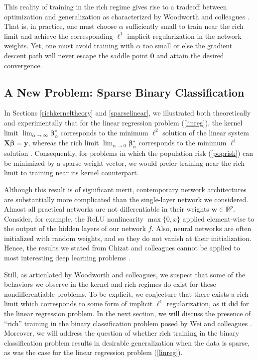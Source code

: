 \documentclass{article}
\begin{document}
This reality of training in the rich regime gives rise to a tradeoff between optimization and generalization as characterized by Woodworth and colleagues \cite{woodworth2020kernel}. That is, in practice, one must choose $\alpha$ sufficiently small to train near the rich limit and achieve the corresponding $\ell^1$ implicit regularization in the network weights. Yet, one must avoid training with $\alpha$ too small or else the gradient descent path will never escape the saddle point $\boldsymbol{0}$ and attain the desired convergence.

\subsection{A New Problem: Sparse Binary Classification}\label{sparselogistic}
In Sections \ref{richkerneltheory} and \ref{sparselinear}, we illustrated both theoretically and experimentally that for the linear regression problem (\ref{linreg}), the kernel limit $\lim_{\alpha \to \infty}\boldsymbol{\beta}_{\alpha}^{\star}$ corresponds to the minimum $\ell^2$ solution of the linear system $\boldsymbol{X} \boldsymbol{\beta} = \boldsymbol{y}$, whereas the rich limit $\lim_{\alpha \to 0}\boldsymbol{\beta}_{\alpha}^{\star}$ corresponds to the minimum $\ell^1$ solution \cite{woodworth2020kernel}. Consequently, for problems in which the population risk (\ref{poprisk}) can be minimized by a sparse weight vector, we would prefer training near the rich limit to training near its kernel counterpart. 

Although this result is of significant merit, contemporary network architectures are substantially more complicated than the single-layer network we considered. Almost all practical networks are not differentiable in their weights $\boldsymbol{w} \in \mathbb{R}^p$. Consider, for example, the ReLU nonlinearity $\max\{0, x \}$ applied element-wise to the output of the hidden layers of our network $f$. Also, neural networks are often initialized with random weights, and so they do not vanish at their initialization. Hence, the results we stated from Chizat and colleagues cannot be applied to most interesting deep learning problems \cite{chizat2019lazy}. 

Still, as articulated by Woodworth and colleagues, we suspect that some of the behaviors we observe in the kernel and rich regimes do exist for these nondifferentiable problems. To be explicit, we conjecture that there exists a rich limit which corresponds to some form of implicit $\ell^1$ regularization, as it did for the linear regression problem. In the next section, we will discuss the presence of \enquote{rich} training in the binary classification problem posed by Wei and colleagues \cite{wei2019regularization}. Moreover, we will address the question of whether rich training in the binary classification problem results in desirable generalization when the data is sparse, as was the case for the linear regression problem (\ref{linreg}). 
\end{document}
